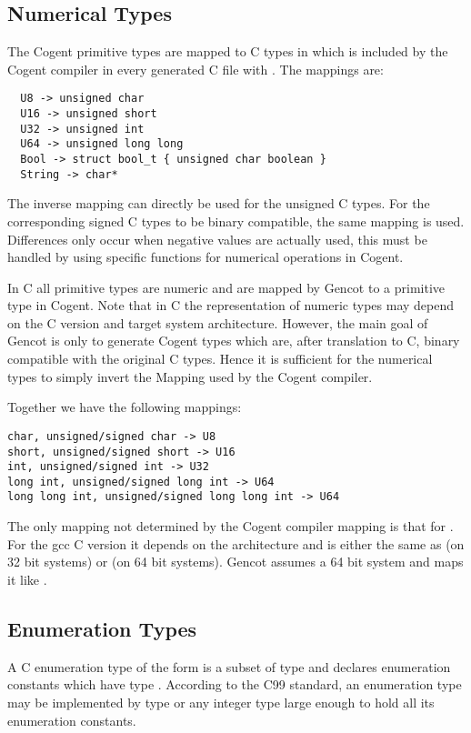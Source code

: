 \subsection{Numerical Types}
\label{design-types-prim}

The Cogent primitive types are mapped to C types in  which is included by the Cogent compiler
in every generated C file with . The mappings are: 
\begin{verbatim}
  U8 -> unsigned char
  U16 -> unsigned short 
  U32 -> unsigned int
  U64 -> unsigned long long
  Bool -> struct bool_t { unsigned char boolean }
  String -> char*
\end{verbatim}
The inverse mapping can directly be used for the unsigned C types. For the corresponding signed C types to be binary
compatible, the same mapping is used. Differences only occur when negative values are actually used, this must be handled by using specific functions for numerical operations in Cogent.

In C all primitive types are numeric and are mapped by Gencot to a primitive type in Cogent. Note that in C the representation 
of numeric types may depend on the C version and target system architecture. However, the main goal of Gencot is only to generate
Cogent types which are, after translation to C, binary compatible with the original C types. Hence it is sufficient for the numerical 
types to simply invert the Mapping used by the Cogent compiler.

Together we have the following mappings:
\begin{verbatim}
char, unsigned/signed char -> U8
short, unsigned/signed short -> U16
int, unsigned/signed int -> U32
long int, unsigned/signed long int -> U64
long long int, unsigned/signed long long int -> U64
\end{verbatim}

The only mapping not determined by the Cogent compiler mapping is that for . For the gcc C version 
it depends on the architecture and is either the same as  (on 32 bit systems) or 
(on 64 bit systems). Gencot assumes a 64 bit system and maps it like .

\subsection{Enumeration Types}
\label{design-types-enum}

A C enumeration type of the form  is a subset of type  and declares enumeration 
constants which have type . According to the C99 standard, an enumeration type may be implemented
by type  or any integer type large enough to hold all its enumeration constants.

